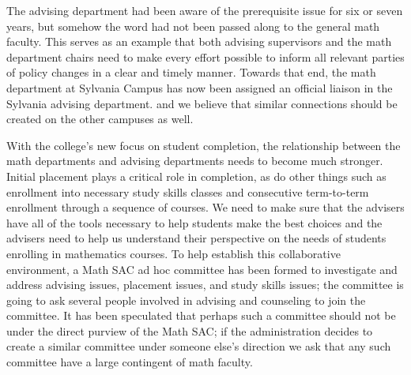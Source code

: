 The advising department had been aware of the prerequisite issue for six or
seven years, but somehow the word had not been passed along to the general math
faculty.  This serves as an example that both advising supervisors and the math
department chairs need to make every effort possible to inform all relevant
parties of policy changes in a clear and timely manner.  Towards that end, the
math department at Sylvania Campus has now been assigned an official liaison in
the Sylvania advising department. and we believe that similar connections
should be created on the other campuses as well.

With the college's new focus on student completion, the relationship between
the math departments and advising departments needs to become much stronger.
Initial placement plays a critical role in completion, as do other things such
as enrollment into necessary study skills classes and consecutive term-to-term
enrollment through a sequence of courses.  We need to make sure that the
advisers have all of the tools necessary to help students make the best choices
and the advisers need to help us understand their perspective on the needs of
students enrolling in mathematics courses.  To help establish this
collaborative environment, a Math SAC ad hoc committee has been formed to
investigate and address advising issues, placement issues, and study
skills issues;  the committee is going to ask several people involved in
advising and counseling to join the committee.  It has been speculated that
perhaps such a committee should not be under the direct purview of the Math
SAC; if the administration decides to create a similar committee under
someone else's direction we ask that any such committee have a large contingent
of math faculty.



